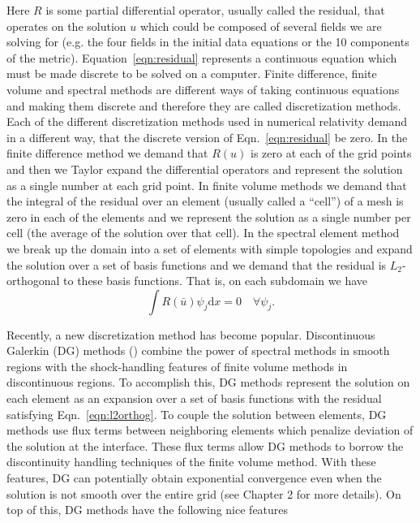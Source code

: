 Here $R$ is some partial differential operator, usually called the residual, that operates on the solution $u$ which could be composed of several fields we are solving for (e.g. the four fields in the initial data equations or the 10 components of the metric). Equation~\ref{eqn:residual} represents a continuous equation which must be made discrete to be solved on a computer. Finite difference, finite volume and spectral methods are different ways of taking continuous equations and making them discrete and therefore they are called discretization methods. Each of the different discretization methods used in numerical relativity demand in a different way, that the discrete version of Eqn.~\ref{eqn:residual} be zero. In the finite difference method we demand that $R(u)$ is zero at each of the grid points and then we Taylor expand the differential operators and represent the solution as a single number at each grid point. In finite volume methods we demand that the integral of the residual over an element (usually called a ``cell'') of a mesh is zero in each of the elements and we represent the solution as a single number per cell (the average of the solution over that cell). In the spectral element method we break up the domain into a set of elements with simple topologies and expand the solution over a set of basis functions and we demand that the residual is $L_2$-orthogonal to these basis functions. That is, on each subdomain we have
%
\begin{equation}
  \label{eqn:l2orthog}
 \int R(\bar u)\psi_j  \mathrm{d}x = 0 \quad \forall \psi_j.
\end{equation}
%

Recently, a new discretization method has become popular. Discontinuous Galerkin (DG) methods (\cite{hesthaven2008nodal,kidder2016spectre}) combine the power of spectral methods in smooth regions with the shock-handling features of finite volume methods in discontinuous regions. To accomplish this, DG methods represent the solution on each element as an expansion over a set of basis functions with the residual satisfying Eqn.~\ref{eqn:l2orthog}. To couple the solution between elements, DG methods use flux terms between neighboring elements which penalize deviation of the solution at the interface. These flux terms allow DG methods to borrow the discontinuity handling techniques of the finite volume method. With these features, DG can potentially obtain exponential convergence even when the solution is not smooth over the entire grid (see Chapter 2 for more details). On top of this, DG methods have the following nice features


